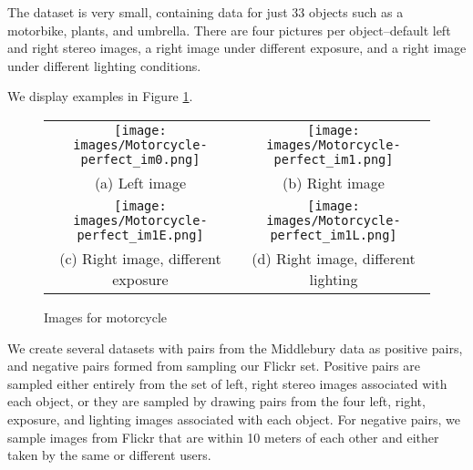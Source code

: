 The dataset is very small, containing data for just 33 objects such as a motorbike, plants, and umbrella. There are four pictures per object--default left and right stereo images, a right image under different exposure, and a right image under different lighting conditions.

We display examples in Figure \ref{fig:middlebury}.

\begin{figure}[!htbp]
	\centering
	\begin{tabular}{cc}
		\texttt{[image: images/Motorcycle-perfect\_im0.png]}  &       \texttt{[image: images/Motorcycle-perfect\_im1.png]}  \\
		(a) Left image & (b) Right image\\[6pt]
		\texttt{[image: images/Motorcycle-perfect\_im1E.png]}  &       \texttt{[image: images/Motorcycle-perfect\_im1L.png]} \\
		(c) Right image, different exposure & (d) Right image, different lighting\\[6pt]
	\end{tabular}
	\label{fig:middlebury}
	\caption{Images for motorcycle}
\end{figure}

We create several datasets with pairs from the Middlebury data as positive pairs, and negative pairs formed from sampling our Flickr set. Positive pairs are sampled either entirely from the set of left, right stereo images associated with each object, or they are sampled by drawing pairs from the four left, right, exposure, and lighting images associated with each object. For negative pairs, we sample images from Flickr that are within 10 meters of each other and either taken by the same or different users.

